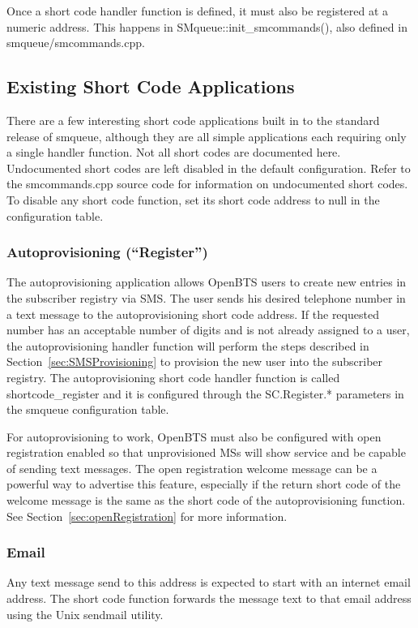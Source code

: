 \documentclass[11pt,openany]{book}
\begin{document}
Once a short code handler function is defined, it must also be registered at a numeric address.  This happens in SMqueue::init\_smcommands(), also defined in smqueue/smcommands.cpp.

\subsection{Existing Short Code Applications}
\label{sec:existingShortCodes}
There are a few interesting short code applications built in to the standard release of smqueue, although they are all simple applications each requiring only a single handler function.
Not all short codes are documented here.  Undocumented short codes are left disabled in the default configuration. Refer to the smcommands.cpp source code for information on undocumented short codes.
To disable any short code function, set its short code address to null in the configuration table.

\subsubsection{Autoprovisioning (``Register'')}
\label{sec:autoprovisioning}
The autoprovisioning application allows OpenBTS users to create new entries in the subscriber registry  via SMS.  The user sends his desired telephone number in a text message to the autoprovisioning short code address.  If the requested number has an acceptable number of digits and is not already assigned to a user, the autoprovisioning handler function will perform the steps described in Section~\ref{sec:SMSProvisioning} to provision the new user into the subscriber registry.  The autoprovisioning short code handler function is called shortcode\_register and it is configured through the SC.Register.* parameters in the smqueue configuration table.

For autoprovisioning to work, OpenBTS must also be configured with open registration enabled so that unprovisioned MSs will show service and be capable of sending text messages.  The open registration welcome message can be a powerful way to advertise this feature, especially if the return short code of the welcome message is the same as the short code of the autoprovisioning function.  See Section~\ref{sec:openRegistration} for more information.

\subsubsection{Email}
Any text message send to this address is expected to start with an internet email address.  The short code function forwards the message text to that email address using the Unix sendmail utility.
\end{document}
